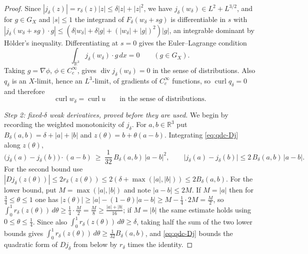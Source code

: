 \documentclass[11pt]{article}
\theoremstyle{definition}
\theoremstyle{plain}
\newcommand{\R}{\mathbb R}
\begin{document}
\begin{proof}
Since $|j_\delta(z)|=r_\delta(z)|z|\le\delta|z|+|z|^2$, we have
$j_\delta(w_\delta)\in L^2+L^{3/2}$, and for $g\in G_X$ and $|s|\le1$ the
integrand of $F_\delta(w_\delta+sg)$ is differentiable in $s$ with
$|j_\delta(w_\delta+sg)\cdot g|\le(\delta|w_\delta|+\delta|g|+(|w_\delta|+|g|)^2)|g|$,
an integrable dominant by H\"older's inequality.  Differentiating at $s=0$
gives the Euler--Lagrange condition
\begin{equation}\label{eq:qdc-EL}
 \int_{\R^3}j_\delta(w_\delta)\cdot g\,dx=0\qquad(g\in G_X).
\end{equation}
Taking $g=\nabla\phi$, $\phi\in C_c^\infty$, gives
$\operatorname{div}j_\delta(w_\delta)=0$ in the sense of distributions.
Also $q_\delta$ is an $X$-limit, hence an $L^3$-limit, of gradients of
$C_c^\infty$ functions, so $\operatorname{curl}q_\delta=0$ and therefore
\begin{equation}\label{eq:qdc-curl}
 \operatorname{curl}w_\delta=\operatorname{curl}u
 \qquad\text{in the sense of distributions}.
\end{equation}

\emph{Step 2: fixed-$\delta$ weak derivatives, proved before they are used.}
We begin by recording the weighted monotonicity of $j_\delta$.  For
$a,b\in\R^3$ put $B_\delta(a,b)=\delta+|a|+|b|$ and $z(\theta)=b+\theta(a-b)$.
Integrating \eqref{eq:qdc-Dj} along $z(\theta)$,
\begin{equation}\label{eq:qdc-mono}
 \bigl(j_\delta(a)-j_\delta(b)\bigr)\cdot(a-b)
 \ \ge\ \frac1{32}\,B_\delta(a,b)\,|a-b|^2,
 \qquad
 \bigl|j_\delta(a)-j_\delta(b)\bigr|\le2\,B_\delta(a,b)\,|a-b| .
\end{equation}
For the second bound use $|Dj_\delta(z(\theta))|\le2r_\delta(z(\theta))
\le2(\delta+\max(|a|,|b|))\le2B_\delta(a,b)$.  For the lower bound, put
$M=\max(|a|,|b|)$ and note $|a-b|\le2M$.  If $M=|a|$ then for
$\frac34\le\theta\le1$ one has
$|z(\theta)|\ge|a|-(1-\theta)|a-b|\ge M-\frac14\cdot2M=\frac M2$, so
$\int_0^1r_\delta(z(\theta))\,d\theta\ge\frac14\cdot\frac M2=\frac M8
\ge\frac{|a|+|b|}{16}$; if $M=|b|$ the same estimate holds using
$0\le\theta\le\frac14$.  Since also
$\int_0^1r_\delta(z(\theta))\,d\theta\ge\delta$, taking half the sum of the
two lower bounds gives
$\int_0^1r_\delta(z(\theta))\,d\theta\ge\frac1{32}B_\delta(a,b)$, and
\eqref{eq:qdc-Dj} bounds the quadratic form of $Dj_\delta$ from below by
$r_\delta$ times the identity.


\end{proof}
\end{document}
